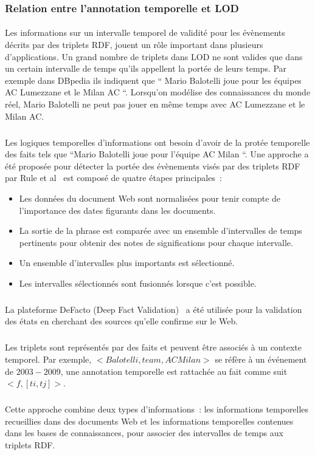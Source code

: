 \documentclass[12pt,a4]{report}
\begin{document}
\subsubsection{Relation entre l'annotation temporelle et LOD}
\paragraph{}
Les informations sur un intervalle temporel de validité pour les évènements décrits par des triplets RDF, jouent un rôle important dans plusieurs d'applications.
Un grand nombre de triplets dans LOD ne sont valides que dans un certain intervalle de temps qu'ils appellent la portée de leurs temps.
Par exemple dans DBpedia ils indiquent que `` Mario Balotelli joue pour les équipes AC Lumezzane et le Milan AC ``. Lorsqu'on modélise des connaissances du monde réel, Mario Balotelli ne peut pas jouer en même temps avec AC Lumezzane et le Milan AC.
\subparagraph{}
Les logiques temporelles d'informations ont besoin d'avoir de la protée temporelle des faits tels que ``Mario Balotelli joue pour l'équipe AC Milan ``.
Une approche a été proposée pour détecter la portée des évènements visés par des triplets RDF par Rule et al~\cite{rula2014} est composé de quatre étapes principales~:
\begin{itemize}
\item Les données du document Web sont normalisées pour tenir compte de l’importance des dates figurants dans les documents.
\item La sortie de la phrase est comparée avec un ensemble d’intervalles de temps pertinents pour obtenir des notes de significations pour chaque intervalle.
\item Un ensemble d’intervalles plus importants est sélectionné.
\item Les intervalles sélectionnés sont fusionnés lorsque c’est possible.
\end{itemize}
\subparagraph{}
La plateforme DeFacto (Deep Fact Validation)~\cite{lehmann2012} a été utilisée pour la validation des états en cherchant des sources qu'elle confirme sur le Web.
\subparagraph{}
Les triplets sont représentés par des faits et peuvent être associés à un contexte temporel.
Par exemple, $<Balotelli, team, AC Milan>$ se réfère à un événement de $2003-2009$, une annotation temporelle est rattachée au fait comme suit $<f, [ti,tj]>$.
\subparagraph{}
Cette approche combine deux types d'informations~: les informations temporelles recueillies dans des documents Web et les informations temporelles contenues dans les bases de connaissances, pour associer des intervalles de temps aux triplets RDF.
\end{document}
